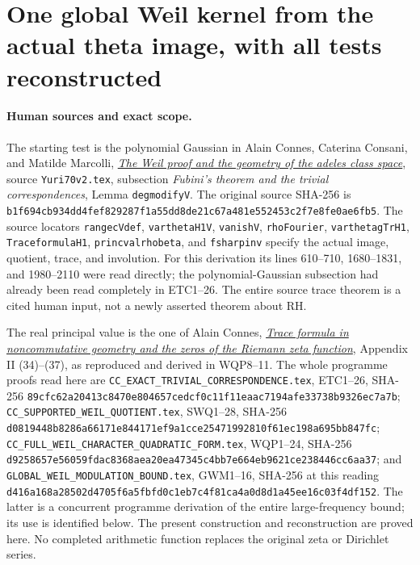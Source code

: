 \section{One global Weil kernel from the actual theta image, with all tests reconstructed}
\label{sec:global-theta-weil-kernel}

\paragraph{Human sources and exact scope.}
The starting test is the polynomial Gaussian in Alain Connes,
Caterina Consani, and Matilde Marcolli,
\href{https://arxiv.org/abs/math/0703392v1}{\emph{The Weil proof and
the geometry of the adeles class space}}, source
\nolinkurl{Yuri70v2.tex}, subsection \emph{Fubini's theorem and the
trivial correspondences}, Lemma \texttt{degmodifyV}. The original
source SHA-256 is
\nolinkurl{b1f694cb934dd4fef829287f1a55dd8de21c67a481e552453c2f7e8fe0ae6fb5}.
The source locators \texttt{rangecVdef}, \texttt{varthetaH1V},
\texttt{vanishV}, \texttt{rhoFourier}, \texttt{varthetagTrH1},
\texttt{TraceformulaH1}, \texttt{princvalrhobeta}, and
\texttt{fsharpinv} specify the actual image, quotient, trace, and
involution. For this derivation its lines 610--710, 1680--1831,
and 1980--2110 were read directly; the polynomial-Gaussian
subsection had already been read completely in ETC1--26.
The entire source trace theorem is a cited human input, not a
newly asserted theorem about RH.

The real principal value is the one of Alain Connes,
\href{https://arxiv.org/abs/math/9811068v1}{\emph{Trace formula in
noncommutative geometry and the zeros of the Riemann zeta function}},
Appendix II (34)--(37), as reproduced and derived in WQP8--11.
The whole programme proofs read here are
\nolinkurl{CC_EXACT_TRIVIAL_CORRESPONDENCE.tex}, ETC1--26,
SHA-256
\nolinkurl{89cfc62a20413c8470e804657cedcf0c11f11eaac7194afe33738b9326ec7a7b};
\nolinkurl{CC_SUPPORTED_WEIL_QUOTIENT.tex}, SWQ1--28,
SHA-256
\nolinkurl{d0819448b8286a66171e844171ef9a1cce25471992810f61ec198a695bb847fc};
\nolinkurl{CC_FULL_WEIL_CHARACTER_QUADRATIC_FORM.tex}, WQP1--24,
SHA-256
\nolinkurl{d9258657e56059fdac8368aea20ea47345c4bb7e664eb9621ce238446cc6aa37};
and \nolinkurl{GLOBAL_WEIL_MODULATION_BOUND.tex}, GWM1--16,
SHA-256 at this reading
\nolinkurl{d416a168a28502d4705f6a5fbfd0c1eb7c4f81ca4a0d8d1a45ee16c03f4df152}.
The latter is a concurrent programme derivation of the entire
large-frequency bound; its use is identified below. The present
construction and reconstruction are proved here. No completed
arithmetic function replaces the original zeta or Dirichlet series.

